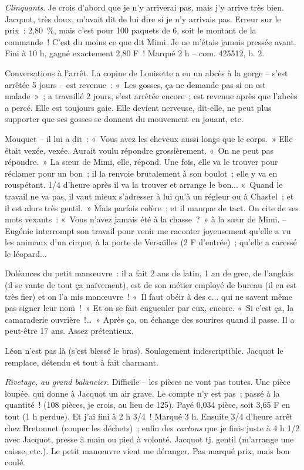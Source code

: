 \documentclass[french,twoside]{book} %
\begin{document}
{\itshape Clinquants}. Je crois d'abord que je n'y arriverai pas, mais j'y arrive très bien. Jacquot, très doux, m'avait dit de lui dire si je n'y arrivais pas. Erreur sur le prix : 2,80 \%, mais c'est pour 100 paquets de 6, soit le montant de la commande ! C'est du moins ce que dit Mimi. Je ne m'étais jamais pressée avant. Fini à 10 h, gagné exactement 2,80 F ! Marqué 2 h – com. 425512, b. 2.\par
Conversations à l'arrêt. La copine de Louisette a eu un abcès à la gorge – s'est arrêtée 5 jours – est revenue : « Les gosses, ça ne demande pas si on est malade » ; a travaillé 2 jours, s'est arrêtée encore ; est revenue après que l'abcès a percé. Elle est toujours gaie. Elle devient nerveuse, dit-elle, ne peut plus supporter que ses gosses se donnent du mouvement en jouant, etc.\par
Mouquet – il lui a dit : « Vous avez les cheveux aussi longs que le corps. » Elle était vexée, vexée. Aurait voulu répondre grossièrement. « On ne peut pas répondre. » La sœur de Mimi, elle, répond. Une fois, elle va le trouver pour réclamer pour un bon ; il la renvoie brutalement à son boulot ; elle y va en rouspétant. 1/4 d'heure après il va la trouver et arrange le bon... « Quand le travail ne va pas, il vaut mieux s'adresser à lui qu'à un régleur ou à Chastel ; et il est alors très gentil. » Mais parfois colère ; et il manque de tact. On cite de ses mots vexants : « Vous n'avez jamais été à la chasse ? » à la sœur de Mimi. – Eugénie interrompt son travail pour venir me raconter joyeusement qu'elle a vu les animaux d'un cirque, à la porte de Versailles (2 F d'entrée) ; qu'elle a caressé le léopard...\par
Doléances du petit manœuvre : il a fait 2 ans de latin, 1 an de grec, de l'anglais (il se vante de tout ça naïvement), est de son métier employé de bureau (il en est très fier) et on l'a mis manœuvre ! « Il faut obéir à des c... qui ne savent même pas signer leur nom ! » Et on se fait engueuler par eux, encore. « Si c'est ça, la camaraderie ouvrière !… » Après ça, on échange des sourires quand il passe. Il a peut-être 17 ans. Assez prétentieux.\par
\par
Léon n'est pas là (s'est blessé le bras). Soulagement indescriptible. Jacquot le remplace, détendu et tout à fait charmant.\par
{\itshape Rivetage, au grand balancier}. Difficile – les pièces ne vont pas toutes. Une pièce loupée, qui donne à Jacquot un air grave. Le compte n'y est pas ; passé à la quantité ! (108 pièces, je crois, au lieu de 125). Payé 0,034 pièce, soit 3,65 F en tout (1 h perdue). Et j'ai fini à 2 h 3/4 ! Marqué 3 h. Ensuite 3/4 d'heure arrêt chez Bretonnet (couper les déchets) ; enfin des {\itshape cartons} que je finis juste à 4 h 1/2 avec Jacquot, presse à main ou pied à volonté. Jacquot tj. gentil (m'arrange une caisse, etc.). Le petit manœuvre vient me déranger. Pas marqué prix, mais bon coulé.\par
\end{document}
